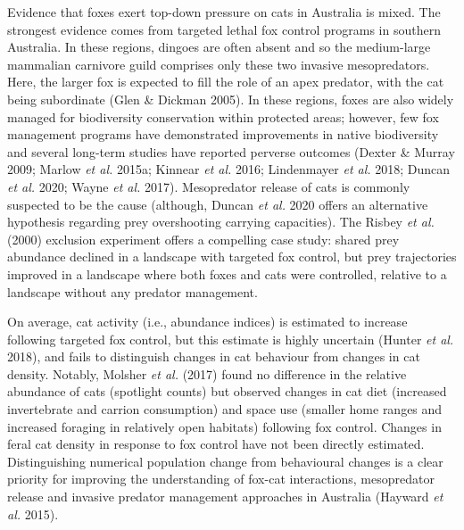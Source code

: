 \documentclass[11pt,a4paper,titlepage,twoside,openright]{style/unimelbthesis}
\begin{document}
\begin{mainmatter}
Evidence that foxes exert top-down pressure on cats in Australia is mixed. The strongest evidence comes from targeted lethal fox control programs in southern Australia. In these regions, dingoes are often absent and so the medium-large mammalian carnivore guild comprises only these two invasive mesopredators. Here, the larger fox is expected to fill the role of an apex predator, with the cat being subordinate (Glen \& Dickman 2005). In these regions, foxes are also widely managed for biodiversity conservation within protected areas; however, few fox management programs have demonstrated improvements in native biodiversity and several long-term studies have reported perverse outcomes (Dexter \& Murray 2009; Marlow \emph{et al.} 2015a; Kinnear \emph{et al.} 2016; Lindenmayer \emph{et al.} 2018; Duncan \emph{et al.} 2020; Wayne \emph{et al.} 2017). Mesopredator release of cats is commonly suspected to be the cause (although, Duncan \emph{et al.} 2020 offers an alternative hypothesis regarding prey overshooting carrying capacities). The Risbey \emph{et al.} (2000) exclusion experiment offers a compelling case study: shared prey abundance declined in a landscape with targeted fox control, but prey trajectories improved in a landscape where both foxes and cats were controlled, relative to a landscape without any predator management.

On average, cat activity (i.e., abundance indices) is estimated to increase following targeted fox control, but this estimate is highly uncertain (Hunter \emph{et al.} 2018), and fails to distinguish changes in cat behaviour from changes in cat density. Notably, Molsher \emph{et al.} (2017) found no difference in the relative abundance of cats (spotlight counts) but observed changes in cat diet (increased invertebrate and carrion consumption) and space use (smaller home ranges and increased foraging in relatively open habitats) following fox control. Changes in feral cat density in response to fox control have not been directly estimated. Distinguishing numerical population change from behavioural changes is a clear priority for improving the understanding of fox-cat interactions, mesopredator release and invasive predator management approaches in Australia (Hayward \emph{et al.} 2015).


\end{mainmatter}
\end{document}
